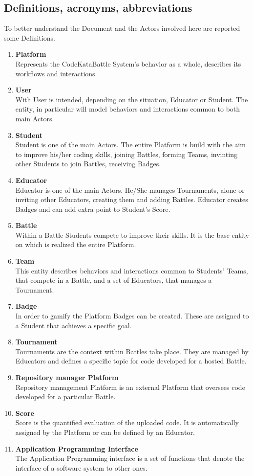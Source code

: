 \subsection{Definitions, acronyms, abbreviations}
To better understand the Document and the Actors involved here are reported some Definitions.
\begin{enumerate}[label=$\bullet$]
    \item \textbf{Platform}\\Represents the CodeKataBattle System's behavior as a whole, describes its workflows and interactions.
    \item \textbf{User}\\With User is intended, depending on the situation, Educator or Student. The entity, in particular will model behaviors and interactions common to both main Actors.
    \item \textbf{Student}\\Student is one of the main Actors. The entire Platform is build with the aim to improve his/her coding skills, joining Battles, forming Teams, invinting other Students to join Battles, receiving Badges.
    \item \textbf{Educator}\\Educator is one of the main Actors. He/She manages Tournaments, alone or inviting other Educators, creating them and adding Battles. Educator creates Badges and can add extra point to Student's Score.
    \item \textbf{Battle}\\Within a Battle Students compete to improve their skills. It is the base entity on which is realized the entire Platform.
    \item \textbf{Team}\\This entity describes behaviors and interactions common to Students' Teams, that compete in a Battle, and a set of Educators, that manages a Tournament.
    \item \textbf{Badge}\\In order to gamify the Platform Badges can be created. These are assigned to a Student that achieves a specific goal.
    \item \textbf{Tournament}\\Tournaments are the context within Battles take place. They are managed by Educators and defines a specific topic for code developed for a hosted Battle.
    \item \textbf{Repository manager Platform}\\Repository management Platform is an external Platform that oversees code developed for a particular Battle.
    \item \textbf{Score}\\Score is the quantified evaluation of the uploaded code. It is automatically assigned by the Platform or can be defined by an Educator.
    \item \textbf{Application Programming Interface}\\ The Application Programming interface is a set of functions that denote the interface of a software system to other ones.
\end{enumerate}
